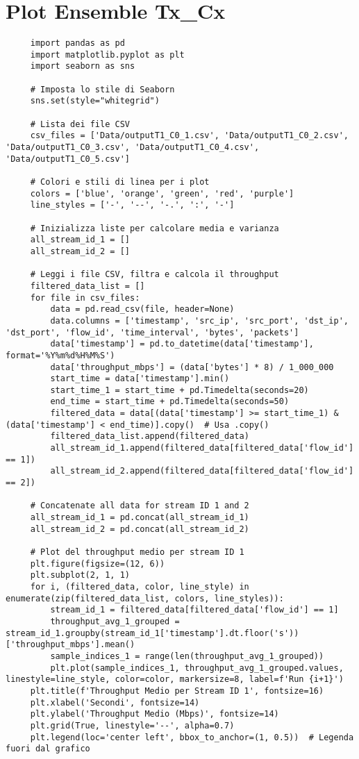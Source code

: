 \section{Plot Ensemble Tx\_Cx}
\label{plot_test_spaghetti}
\begin{lstlisting}
     import pandas as pd
     import matplotlib.pyplot as plt
     import seaborn as sns
     
     # Imposta lo stile di Seaborn
     sns.set(style="whitegrid")
     
     # Lista dei file CSV
     csv_files = ['Data/outputT1_C0_1.csv', 'Data/outputT1_C0_2.csv', 'Data/outputT1_C0_3.csv', 'Data/outputT1_C0_4.csv', 'Data/outputT1_C0_5.csv']
     
     # Colori e stili di linea per i plot
     colors = ['blue', 'orange', 'green', 'red', 'purple']
     line_styles = ['-', '--', '-.', ':', '-']
     
     # Inizializza liste per calcolare media e varianza
     all_stream_id_1 = []
     all_stream_id_2 = []
     
     # Leggi i file CSV, filtra e calcola il throughput
     filtered_data_list = []
     for file in csv_files:
         data = pd.read_csv(file, header=None)
         data.columns = ['timestamp', 'src_ip', 'src_port', 'dst_ip', 'dst_port', 'flow_id', 'time_interval', 'bytes', 'packets']
         data['timestamp'] = pd.to_datetime(data['timestamp'], format='%Y%m%d%H%M%S')
         data['throughput_mbps'] = (data['bytes'] * 8) / 1_000_000
         start_time = data['timestamp'].min()
         start_time_1 = start_time + pd.Timedelta(seconds=20)
         end_time = start_time + pd.Timedelta(seconds=50)
         filtered_data = data[(data['timestamp'] >= start_time_1) & (data['timestamp'] < end_time)].copy()  # Usa .copy()
         filtered_data_list.append(filtered_data)
         all_stream_id_1.append(filtered_data[filtered_data['flow_id'] == 1])
         all_stream_id_2.append(filtered_data[filtered_data['flow_id'] == 2])
     
     # Concatenate all data for stream ID 1 and 2
     all_stream_id_1 = pd.concat(all_stream_id_1)
     all_stream_id_2 = pd.concat(all_stream_id_2)
     
     # Plot del throughput medio per stream ID 1
     plt.figure(figsize=(12, 6))
     plt.subplot(2, 1, 1)
     for i, (filtered_data, color, line_style) in enumerate(zip(filtered_data_list, colors, line_styles)):
         stream_id_1 = filtered_data[filtered_data['flow_id'] == 1]
         throughput_avg_1_grouped = stream_id_1.groupby(stream_id_1['timestamp'].dt.floor('s'))['throughput_mbps'].mean()
         sample_indices_1 = range(len(throughput_avg_1_grouped))
         plt.plot(sample_indices_1, throughput_avg_1_grouped.values, linestyle=line_style, color=color, markersize=8, label=f'Run {i+1}')
     plt.title(f'Throughput Medio per Stream ID 1', fontsize=16)
     plt.xlabel('Secondi', fontsize=14)
     plt.ylabel('Throughput Medio (Mbps)', fontsize=14)
     plt.grid(True, linestyle='--', alpha=0.7)
     plt.legend(loc='center left', bbox_to_anchor=(1, 0.5))  # Legenda fuori dal grafico
     

\end{lstlisting}
